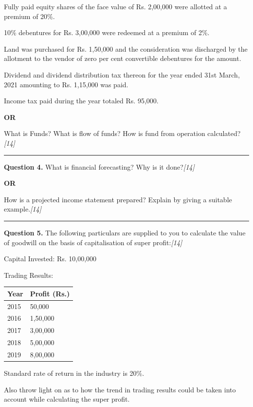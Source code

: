 \documentclass[11pt,a4paper]{article}
\newcommand{\pts}[1]{\hfill   \textit{[#1]}}
\begin{document}
\begin{parts}
  \item Fully paid equity shares of the face value of Rs. 2,00,000 were allotted at a premium of 20\%.
  \item 10\% debentures for Rs. 3,00,000 were redeemed at a premium of 2\%.
  \item Land was purchased for Rs. 1,50,000 and the consideration was discharged by the allotment to the vendor of zero per cent convertible debentures for the amount.
  \item Dividend and dividend distribution tax thereon for the year ended 31st March, 2021 amounting to Rs. 1,15,000 was paid.
  \item Income tax paid during the year totaled Rs. 95,000.
\end{parts}

\centerline{   \textbf{OR}}

What is Funds? What is flow of funds? How is fund from operation calculated?\pts{14}

\medskip\rule{\linewidth}{0.2pt}




\noindent   \textbf{Question 4.}
What is financial forecasting? Why is it done?\pts{14}

\centerline{   \textbf{OR}}

How is a projected income statement prepared? Explain by giving a suitable example.\pts{14}

\medskip\rule{\linewidth}{0.2pt}




\noindent   \textbf{Question 5.}
The following particulars are supplied to you to calculate the value of goodwill on the basis of capitalisation of super profit:\pts{14}

\begin{parts}
  \item Capital Invested: Rs. 10,00,000
  \item Trading Results:
  
\begin{center}
  
\begin{tabular}{ll}
    \hline
    Year & Profit (Rs.) \\
    \hline
    2015 & 50,000 \\
    2016 & 1,50,000 \\
    2017 & 3,00,000 \\
    2018 & 5,00,000 \\
    2019 & 8,00,000 \\
    \hline
  \end{tabular}
  \end{center}
  \item Standard rate of return in the industry is 20\%.
\end{parts}
Also throw light on as to how the trend in trading results could be taken into account while calculating the super profit.
\end{document}

